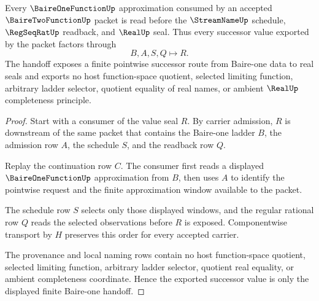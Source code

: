 \begin{theorem}
\label{thm:baire-two-function-baire-one-handoff}
Every $\BaireOneFunctionUp$ approximation consumed by an accepted $\BaireTwoFunctionUp$ packet is read before the $\StreamNameUp$ schedule, $\RegSeqRatUp$ readback, and $\RealUp$ seal. Thus every successor value exported by the packet factors through
$$
B,A,S,Q \longmapsto R .
$$
The handoff exposes a finite pointwise successor route from Baire-one data to real seals and exports no host function-space quotient, selected limiting function, arbitrary ladder selector, quotient equality of real names, or ambient $\RealUp$ completeness principle.
\end{theorem}
\begin{proof}
Start with a consumer of the value seal $R$. By carrier admission, $R$ is downstream of the same packet that contains the Baire-one ladder $B$, the admission row $A$, the schedule $S$, and the readback row $Q$.

Replay the continuation row $C$. The consumer first reads a displayed $\BaireOneFunctionUp$ approximation from $B$, then uses $A$ to identify the pointwise request and the finite approximation window available to the packet.

The schedule row $S$ selects only those displayed windows, and the regular rational row $Q$ reads the selected observations before $R$ is exposed. Componentwise transport by $H$ preserves this order for every accepted carrier.

The provenance and local naming rows contain no host function-space quotient, selected limiting function, arbitrary ladder selector, quotient real equality, or ambient completeness coordinate. Hence the exported successor value is only the displayed finite Baire-one handoff.
\end{proof}


